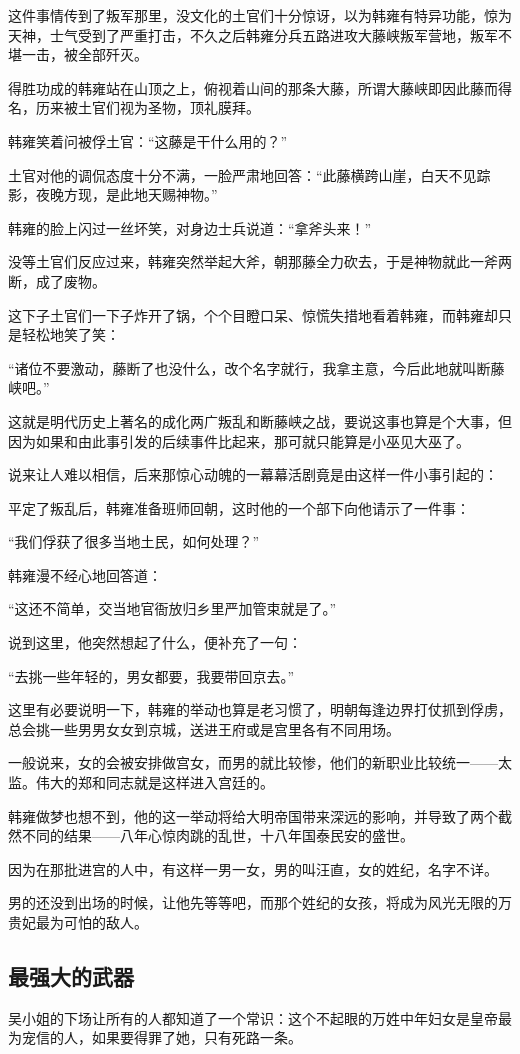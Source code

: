 \begin{multicols}{\theparacolNo}
这件事情传到了叛军那里，没文化的土官们十分惊讶，以为韩雍有特异功能，惊为天神，士气受到了严重打击，不久之后韩雍分兵五路进攻大藤峡叛军营地，叛军不堪一击，被全部歼灭。

得胜功成的韩雍站在山顶之上，俯视着山间的那条大藤，所谓大藤峡即因此藤而得名，历来被土官们视为圣物，顶礼膜拜。

韩雍笑着问被俘土官：“这藤是干什么用的？”

土官对他的调侃态度十分不满，一脸严肃地回答：“此藤横跨山崖，白天不见踪影，夜晚方现，是此地天赐神物。”

韩雍的脸上闪过一丝坏笑，对身边士兵说道：“拿斧头来！”

没等土官们反应过来，韩雍突然举起大斧，朝那藤全力砍去，于是神物就此一斧两断，成了废物。

这下子土官们一下子炸开了锅，个个目瞪口呆、惊慌失措地看着韩雍，而韩雍却只是轻松地笑了笑：

“诸位不要激动，藤断了也没什么，改个名字就行，我拿主意，今后此地就叫断藤峡吧。”

这就是明代历史上著名的成化两广叛乱和断藤峡之战，要说这事也算是个大事，但因为如果和由此事引发的后续事件比起来，那可就只能算是小巫见大巫了。

说来让人难以相信，后来那惊心动魄的一幕幕活剧竟是由这样一件小事引起的：

平定了叛乱后，韩雍准备班师回朝，这时他的一个部下向他请示了一件事：

“我们俘获了很多当地土民，如何处理？”

韩雍漫不经心地回答道：

“这还不简单，交当地官衙放归乡里严加管束就是了。”

说到这里，他突然想起了什么，便补充了一句：

“去挑一些年轻的，男女都要，我要带回京去。”

这里有必要说明一下，韩雍的举动也算是老习惯了，明朝每逢边界打仗抓到俘虏，总会挑一些男男女女到京城，送进王府或是宫里各有不同用场。

一般说来，女的会被安排做宫女，而男的就比较惨，他们的新职业比较统一——太监。伟大的郑和同志就是这样进入宫廷的。

韩雍做梦也想不到，他的这一举动将给大明帝国带来深远的影响，并导致了两个截然不同的结果——八年心惊肉跳的乱世，十八年国泰民安的盛世。

因为在那批进宫的人中，有这样一男一女，男的叫汪直，女的姓纪，名字不详。

男的还没到出场的时候，让他先等等吧，而那个姓纪的女孩，将成为风光无限的万贵妃最为可怕的敌人。

\subsection{最强大的武器}
吴小姐的下场让所有的人都知道了一个常识：这个不起眼的万姓中年妇女是皇帝最为宠信的人，如果要得罪了她，只有死路一条。


\end{multicols}
